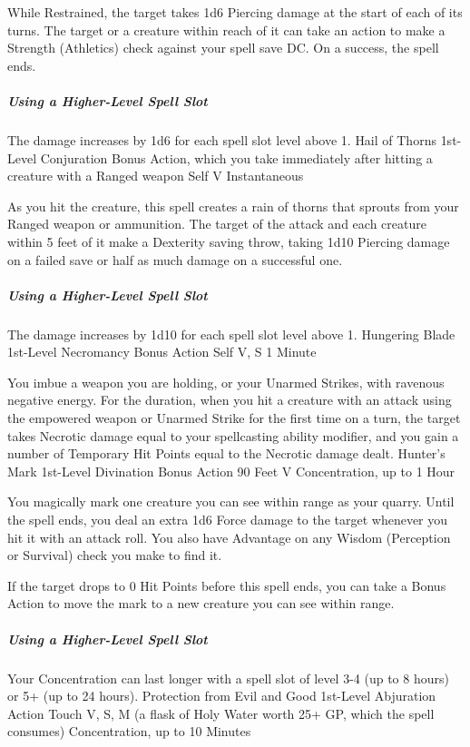 \documentclass[letterpaper,openany,oneside,twocolumn]{book}
\begin{document}
While Restrained, the target takes 1d6 Piercing damage at the start of each of its turns. The target or a creature within reach of it can take an action to make a Strength (Athletics) check against your spell save DC. On a success, the spell ends.

\subparagraph*{Using a Higher-Level Spell Slot} The damage increases by 1d6 for each spell slot level above 1.
\DndSpellHeader
  {Hail of Thorns}
  {1st-Level Conjuration}
  {Bonus Action, which you take immediately after hitting a creature with a Ranged weapon}
  {Self}
  {V}
  {Instantaneous}
  
As you hit the creature, this spell creates a rain of thorns that sprouts from your Ranged weapon or ammunition. The target of the attack and each creature within 5 feet of it make a Dexterity saving throw, taking 1d10 Piercing damage on a failed save or half as much damage on a successful one.

\subparagraph*{Using a Higher-Level Spell Slot} The damage increases by 1d10 for each spell slot level above 1.
\DndSpellHeader
  {Hungering Blade}
  {1st-Level Necromancy}
  {Bonus Action}
  {Self}
  {V, S}
  {1 Minute}
  
You imbue a weapon you are holding, or your Unarmed Strikes, with ravenous negative energy. For the duration, when you hit a creature with an attack using the empowered weapon or Unarmed Strike for the first time on a turn, the target takes Necrotic damage equal to your spellcasting ability modifier, and you gain a number of Temporary Hit Points equal to the Necrotic damage dealt.
\DndSpellHeader
  {Hunter's Mark}
  {1st-Level Divination}
  {Bonus Action}
  {90 Feet}
  {V}
  {Concentration, up to 1 Hour}
  
You magically mark one creature you can see within range as your quarry. Until the spell ends, you deal an extra 1d6 Force damage to the target whenever you hit it with an attack roll. You also have Advantage on any Wisdom (Perception or Survival) check you make to find it.

If the target drops to 0 Hit Points before this spell ends, you can take a Bonus Action to move the mark to a new creature you can see within range.

\subparagraph*{Using a Higher-Level Spell Slot} Your Concentration can last longer with a spell slot of level 3-4 (up to 8 hours) or 5+ (up to 24 hours).
\DndSpellHeader
  {Protection from Evil and Good}
  {1st-Level Abjuration}
  {Action}
  {Touch}
  {V, S, M (a flask of Holy Water worth 25+ GP, which the spell consumes)}
  {Concentration, up to 10 Minutes}
  
\end{document}
